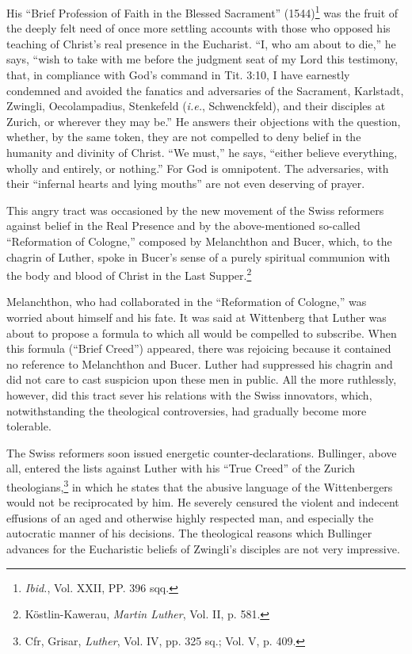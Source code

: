 His “Brief Profession of Faith in the Blessed Sacrament” (1544)\footnote{\textit{Ibid.}, Vol. XXII, PP. 396 sqq.}
was the fruit of the deeply felt need of once more settling accounts
with those who opposed his teaching of Christ’s real presence in the
Eucharist. “I, who am about to die,” he says, “wish to take with me
before the judgment seat of my Lord this testimony, that, in compliance
with God’s command in Tit. 3:10, I have earnestly condemned and avoided
the fanatics and adversaries of the Sacrament,
Karlstadt, Zwingli, Oecolampadius, Stenkefeld (\textit{i.e.}, Schwenckfeld),
and their disciples at Zurich, or wherever they may be.” He answers
their objections with the question, whether, by the same token, they
are not compelled to deny belief in the humanity and divinity of
Christ. “We must,” he says, “either believe everything, wholly and
entirely, or nothing.” For God is omnipotent. The adversaries, with
their “infernal hearts and lying mouths” are not even deserving of
prayer.

This angry tract was occasioned by the new movement of the Swiss
reformers against belief in the Real Presence and by the above-mentioned
so-called “Reformation of Cologne,” composed by Melanchthon and Bucer,
which, to the chagrin of Luther, spoke in
Bucer’s sense of a purely spiritual communion with the body and blood
of Christ in the Last Supper.\footnote{Köstlin-Kawerau, \textit{Martin Luther}, Vol. II, p. 581.}

Melanchthon, who had collaborated in
the “Reformation of Cologne,” was worried about himself and his
fate. It was said at Wittenberg that Luther was about to propose a
formula to which all would be compelled to subscribe. When this
formula (“Brief Creed”) appeared, there was rejoicing because it
contained no reference to Melanchthon and Bucer. Luther had suppressed
his chagrin and did not care to cast suspicion upon these men
in public. All the more ruthlessly, however, did this tract sever his
relations with the Swiss innovators, which, notwithstanding the theological
controversies, had gradually become more tolerable.

The Swiss reformers soon issued energetic counter-declarations. Bullinger,
above all, entered the lists against Luther with his “True Creed” of the Zurich
theologians,\footnote{Cfr, Grisar, \textit{Luther}, Vol. IV, pp. 325 sq.; Vol.
V, p. 409.} in which he states that the abusive language of the Wittenbergers
would not be reciprocated by him. He severely censured the violent and indecent
effusions of an aged and otherwise highly respected man, and especially the
autocratic manner of his decisions. The theological reasons which Bullinger
advances for the Eucharistic beliefs of Zwingli’s disciples are not very
impressive.

